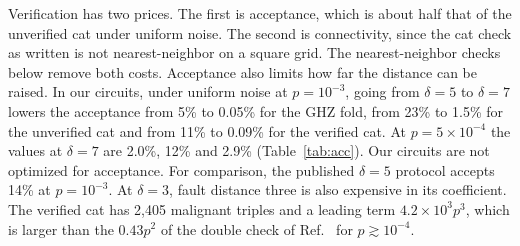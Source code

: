 \documentclass[aps,prl,reprint,twocolumn,amsmath,amssymb,floatfix,nofootinbib,superscriptaddress]{revtex4-2}
\theoremstyle{definition}
\theoremstyle{remark}
\begin{document}
Verification has two prices. The first is acceptance, which is about half that of the unverified cat under uniform noise. The second is connectivity, since the cat check as written is not nearest-neighbor on a square grid. The nearest-neighbor checks below remove both costs. Acceptance also limits how far the distance can be raised. In our circuits, under uniform noise at $p=10^{-3}$, going from $\delta=5$ to $\delta=7$ lowers the acceptance from 5\% to 0.05\% for the GHZ fold, from 23\% to 1.5\% for the unverified cat and from 11\% to 0.09\% for the verified cat. At $p=5\times10^{-4}$ the values at $\delta=7$ are 2.0\%, 12\% and 2.9\% (Table~\ref{tab:acc}). Our circuits are not optimized for acceptance. For comparison, the published $\delta=5$ protocol accepts 14\% at $p=10^{-3}$. At $\delta=3$, fault distance three is also expensive in its coefficient. The verified cat has 2,405 malignant triples and a leading term $4.2\times10^3p^3$, which is larger than the $0.43p^2$ of the double check of Ref.~\cite{cultivation} for $p\gtrsim10^{-4}$.
\end{document}
